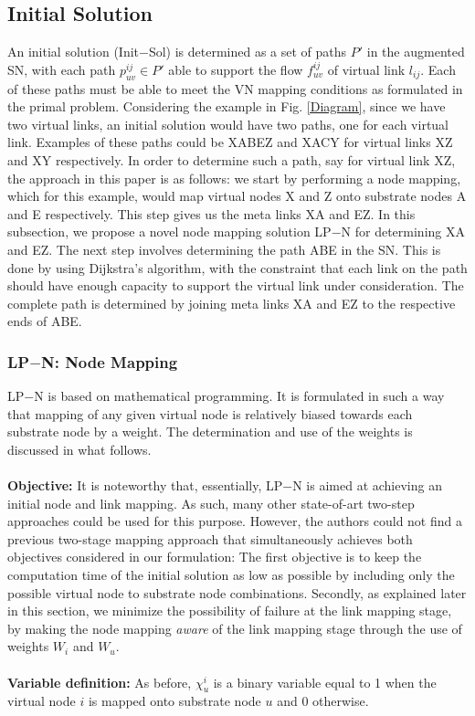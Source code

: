\documentclass[journal]{IEEEtran}
\begin{document}
\subsection{Initial Solution}
An initial solution (Init$-$Sol) is determined as a set of paths $P'$ in the augmented \ac{SN}, with each path $p_{uv}^{ij} \in P'$ able to support the flow $f_{uv}^{ij}$ of virtual link $l_{ij}$. Each of these paths must be able to meet the \ac{VN} mapping conditions as formulated in the primal problem. Considering the example in Fig. \ref{Diagram}, since we have two virtual links, an initial solution would have two paths, one for each virtual link. Examples of these paths could be XABEZ and XACY for virtual links XZ and XY respectively. In order to determine such a path, say for virtual link XZ, the approach in this paper is as follows: we start by performing a node mapping, which for this example, would map virtual nodes X and Z onto substrate nodes A and E respectively. This step gives us the meta links XA and EZ. In this subsection, we propose a novel node mapping solution LP$-$N for determining XA and EZ. The next step involves determining the path ABE in the \ac{SN}. This is done by using Dijkstra's algorithm, with the constraint that each link on the path should have enough capacity to support the virtual link under consideration. The complete path is determined by joining meta links XA and EZ to the respective ends of ABE.\\
\subsubsection*{LP$-$N: Node Mapping}
LP$-$N is based on mathematical programming. It is formulated in such a way that mapping of any given virtual node is relatively biased towards each substrate node by a weight. The determination and use of the weights is discussed in what follows.\\\\
\textbf{Objective:} 
It is noteworthy that, essentially, LP$-$N is aimed at achieving an initial node and link mapping. As such, many other state-of-art two-step approaches \cite{Fischer13} could be used for this purpose. However, the authors could not find a previous two-stage mapping approach that simultaneously achieves  both objectives considered in our formulation: The first objective is to keep the computation time of the initial solution as low as possible by including only the possible virtual node to substrate node combinations. Secondly, as explained later in this section, we minimize the possibility of failure at the link mapping stage, by making the node mapping \emph{aware} of the link mapping stage through the use of weights $W_{i}$ and $W_{u}$.\\\\
\textbf{Variable definition:} As before, $\chi_{u}^{i}$ is a binary variable equal to 1 when the virtual node $i$ is mapped onto substrate node $u$ and 0 otherwise.\\
\end{document}
